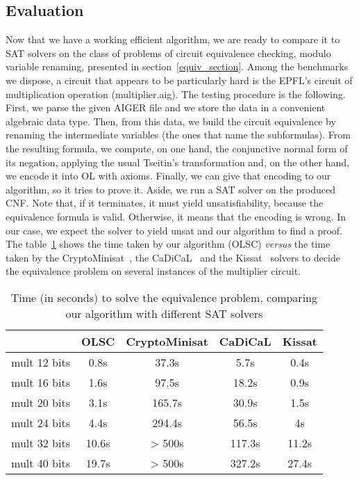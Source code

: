 \documentclass[a4paper, 11pt]{article}
\begin{document}
    \subsection{Evaluation}
    Now that we have a working efficient algorithm, we are ready to compare it to SAT solvers on the
    class of problems of circuit equivalence checking, modulo variable renaming, presented in 
    section~\ref{equiv_section}. Among the benchmarks we dispose, a circuit that appears to be
    particularly hard is the EPFL's circuit of multiplication operation (\textsf{multiplier.aig}). 
    The testing procedure is the
    following. First, we parse the given AIGER file and we store the data in a convenient algebraic
    data type. Then, from this data, we build the circuit equivalence by renaming the intermediate
    variables (the ones that name the subformulas). From the resulting formula, we compute, on one hand, 
    the conjunctive normal form of its negation, applying the usual Tseitin's transformation and, on 
    the other hand, we
    encode it into OL with axioms. Finally, we can give that encoding to our algorithm, so it tries
    to prove it. Aside, we run a SAT solver on the produced CNF. Note that, if it terminates,
    it must yield unsatisfiability, because the equivalence formula is valid. Otherwise, it means that
    the encoding is wrong. 
    In our case, we expect the solver to yield unsat and our algorithm to find a proof.
    The table~\ref{benchmark_equiv} shows the time taken by our algorithm (OLSC) \textit{versus} the time
    taken by the CryptoMinisat~\cite{10.1007/978-3-642-02777-2_24},
    the CaDiCaL~\cite{BiereFallerFazekasFleuryFroleyks-CAV24} and the 
    Kissat~\cite{BiereFallerFazekasFleuryFroleyksPollitt-SAT-Competition-2024-solvers} solvers to decide 
    the equivalence problem on several instances of the multiplier circuit.
    \begin{table}[h] 
	    \begin{center}
		    \begin{tabular}{|c||c|c|c|c|}
			    \hline
			     &OLSC&CryptoMinisat&CaDiCaL&Kissat\\
			     \hline\hline
			     mult 12 bits&0.8s&37.3s&5.7s&0.4s\\
			     mult 16 bits&1.6s&97.5s&18.2s&0.9s\\
			     mult 20 bits&3.1s&165.7s&30.9s&1.5s\\
			     mult 24 bits&4.4s&294.4s&56.5s&4s\\
			     mult 32 bits&10.6s&> 500s&117.3s&11.2s\\
			     mult 40 bits&19.7s&> 500s&327.2s&27.4s\\
			     \hline
		    \end{tabular}
	    \end{center}
	    \caption{Time (in seconds) to solve the equivalence problem, comparing our algorithm with
	    different SAT solvers}
	    \label{benchmark_equiv}
    \end{table}
\end{document}
